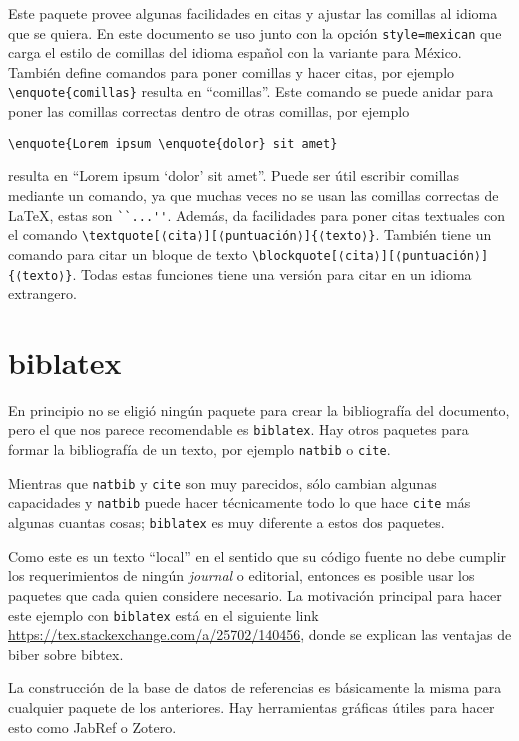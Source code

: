 Este paquete provee algunas facilidades en citas y ajustar las
comillas al idioma que se quiera. En este documento se uso junto con la
opción \texttt{style=mexican} que carga el estilo de comillas del idioma
español con la variante para México. También define comandos para poner
comillas y hacer citas, por ejemplo \verb|\enquote{comillas}| resulta en
\enquote{comillas}. Este comando se puede anidar para poner las comillas
correctas dentro de otras comillas, por ejemplo
\begin{flushleft}
  \verb|\enquote{Lorem ipsum \enquote{dolor} sit amet}|
\end{flushleft}
resulta en \enquote{Lorem ipsum \enquote{dolor} sit amet}. Puede ser útil
escribir comillas mediante un comando, ya que muchas veces no se usan las
comillas correctas de \LaTeX, estas son \verb|``...''|. Además, da
facilidades para poner citas textuales con el comando
\verb|\textquote[⟨cita⟩][⟨puntuación⟩]{⟨texto⟩}|. También tiene un comando para citar un bloque de texto \verb|\blockquote[⟨cita⟩][⟨puntuación⟩]{⟨texto⟩}|. Todas estas funciones tiene una versión para citar en un idioma extrangero.


\section{biblatex}%
\label{sec:bib}
En principio no se eligió ningún paquete para crear la bibliografía del documento, pero el que nos parece recomendable es \texttt{biblatex}. Hay otros paquetes para formar la bibliografía de un texto, por ejemplo
\texttt{natbib} o \texttt{cite}.

Mientras que \texttt{natbib} y \texttt{cite} son muy parecidos, sólo cambian
algunas capacidades y \texttt{natbib} puede hacer técnicamente todo lo que
hace \texttt{cite} más algunas cuantas cosas; \texttt{biblatex} es muy
diferente a estos dos paquetes.

Como este es un texto \enquote{local} en el sentido que su código fuente no debe
cumplir los requerimientos de ningún \textit{journal} o editorial, entonces
es posible usar los paquetes que cada quien considere necesario. La
motivación principal para hacer este ejemplo con \texttt{biblatex} está
en el siguiente link \url{https://tex.stackexchange.com/a/25702/140456},
donde se explican las ventajas de biber sobre bibtex.

La construcción de la base de datos de referencias es básicamente la misma
para cualquier paquete de los anteriores. Hay herramientas gráficas útiles
para hacer esto como JabRef o Zotero.

